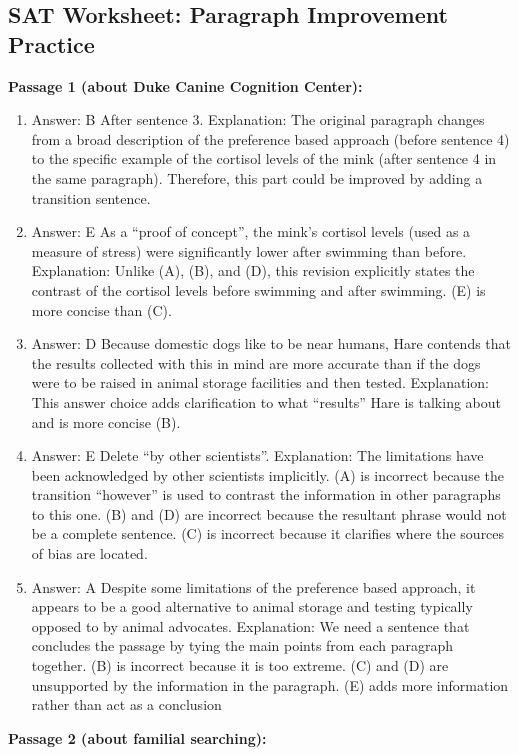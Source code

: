 \subsection{SAT Worksheet: Paragraph Improvement Practice}


\textbf{Passage 1 (about Duke Canine Cognition Center):}

\begin{enumerate}
\item Answer: B After sentence 3. Explanation: The original paragraph changes from a broad description of the preference based approach (before sentence 4) to the specific example of the cortisol levels of the mink (after sentence 4 in the same paragraph). Therefore, this part could be improved by adding a transition sentence. 
\item Answer: E As a ``proof of concept'', the mink's cortisol levels (used as a measure of stress) were significantly lower after swimming than before. Explanation: Unlike (A), (B), and (D), this revision explicitly states the contrast of the cortisol levels before swimming and after swimming. (E) is more concise than (C). 
\item Answer: D Because domestic dogs like to be near humans, Hare contends that the results collected with this in mind are more accurate than if the dogs were to be raised in animal storage facilities and then tested. Explanation: This answer choice adds clarification to what ``results'' Hare is talking about and is more concise (B).
\item Answer: E Delete ``by other scientists''. Explanation: The limitations have been acknowledged by other scientists implicitly. (A) is incorrect because the transition ``however'' is used to contrast the information in other paragraphs to this one. (B) and (D) are incorrect because the resultant phrase would not be a complete sentence. (C) is incorrect because it clarifies where the sources of bias are located.
\item Answer: A Despite some limitations of the preference based approach, it appears to be a good
alternative to animal storage and testing typically opposed to by animal advocates. Explanation: We need a sentence that concludes the passage by tying the main points from each paragraph together. (B) is incorrect because it is too extreme. (C) and (D) are unsupported by the information in the paragraph. (E) adds more information rather than act as a conclusion
\end{enumerate}

\textbf{Passage 2 (about familial searching):}

